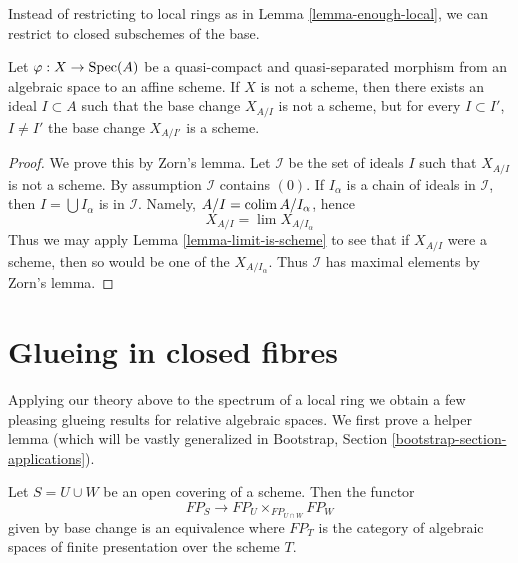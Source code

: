 \noindent
Instead of restricting to local rings as in Lemma \ref{lemma-enough-local},
we can restrict to closed subschemes of the base.

\begin{lemma}
\label{lemma-maximal-ideal}
Let $\varphi : X \to \mathop{\mathrm{Spec}}(A)$ be a quasi-compact and quasi-separated
morphism from an algebraic space to an affine scheme.
If $X$ is not a scheme, then there exists an ideal $I \subset A$
such that the base change $X_{A/I}$ is not a scheme, but
for every $I \subset I'$, $I \not = I'$ the base change
$X_{A/I'}$ is a scheme.
\end{lemma}

\begin{proof}
We prove this by Zorn's lemma. Let $\mathcal{I}$ be the set
of ideals $I$ such that $X_{A/I}$ is not a scheme. By
assumption $\mathcal{I}$ contains $(0)$. If $I_\alpha$ is
a chain of ideals in $\mathcal{I}$, then
$I = \bigcup I_\alpha$ is in $\mathcal{I}$. Namely,
$A/I = \mathop{\mathrm{colim}}\nolimits A/I_\alpha$, hence
$$
X_{A/I} = \lim X_{A/I_\alpha}
$$
Thus we may apply Lemma \ref{lemma-limit-is-scheme} to see that if $X_{A/I}$
were a scheme, then so would be one of the $X_{A/I_\alpha}$.
Thus $\mathcal{I}$ has maximal elements by Zorn's lemma.
\end{proof}






\section{Glueing in closed fibres}
\label{section-change-over-closed-points}

\noindent
Applying our theory above to the spectrum of a local ring we obtain
a few pleasing glueing results for relative algebraic spaces.
We first prove a helper lemma (which will be vastly generalized
in Bootstrap, Section \ref{bootstrap-section-applications}).

\begin{lemma}
\label{lemma-relative-glueing}
Let $S = U \cup W$ be an open covering of a scheme. Then the functor
$$
FP_S \longrightarrow FP_U \times_{FP_{U \cap W}} FP_W
$$
given by base change is an equivalence where $FP_T$
is the category of algebraic spaces of finite presentation over
the scheme $T$.
\end{lemma}

